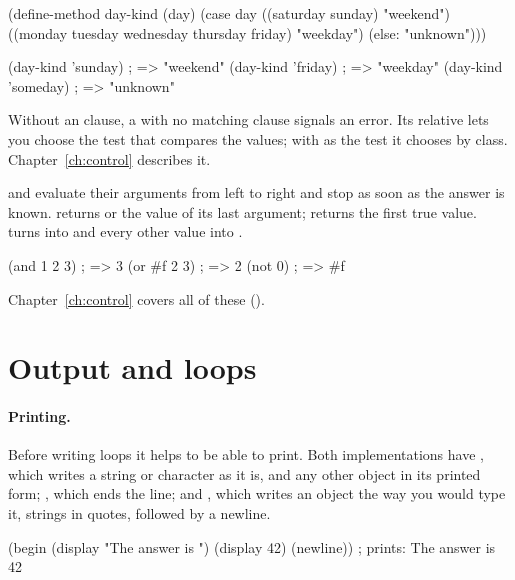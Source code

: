 \begin{dylan}
(define-method day-kind (day)
  (case day
    ((saturday sunday) "weekend")
    ((monday tuesday wednesday thursday friday) "weekday")
    (else: "unknown")))

(day-kind 'sunday)              ; => "weekend"
(day-kind 'friday)              ; => "weekday"
(day-kind 'someday)             ; => "unknown"
\end{dylan}

Without an  clause, a  with no matching clause
signals an error. Its relative  lets you choose the test that
compares the values; with  as the test it chooses by
class. Chapter~\ref{ch:control} describes it.

 and  evaluate their arguments from left to right and
stop as soon as the answer is known.  returns  or the
value of its last argument;  returns the first true value.
 turns  into  and every other value into
.

\begin{dylan}
(and 1 2 3)                     ; => 3
(or #f 2 3)                     ; => 2
(not 0)                         ; => #f
\end{dylan}

Chapter~\ref{ch:control} covers all of these ().

\section{Output and loops}\label{sec:tut-loops}

\paragraph{Printing.}
Before writing loops it helps to be able to print. Both implementations
have , which writes a string or character as it is, and any
other object in its printed form; , which ends the line; and
, which writes an object the way you would type it, strings in
quotes, followed by a newline.

\begin{dylan}
(begin
  (display "The answer is ")
  (display 42)
  (newline))
; prints: The answer is 42
\end{dylan}

